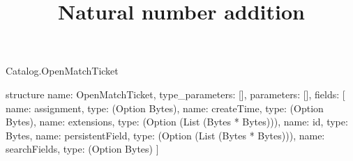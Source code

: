 \begin{lexlean}{Catalog.OpenMatchTicket}
\title{Natural number addition}
\begin{semanticmodule}
structure{
  name: OpenMatchTicket,
  type_parameters: [],
  parameters: [],
  fields: [
    {name: assignment, type: (Option Bytes)},
    {name: createTime, type: (Option Bytes)},
    {name: extensions, type: (Option (List (Bytes * Bytes)))},
    {name: id, type: Bytes},
    {name: persistentField, type: (Option (List (Bytes * Bytes)))},
    {name: searchFields, type: (Option Bytes)}
  ]
}
\end{semanticmodule}
\end{lexlean}
